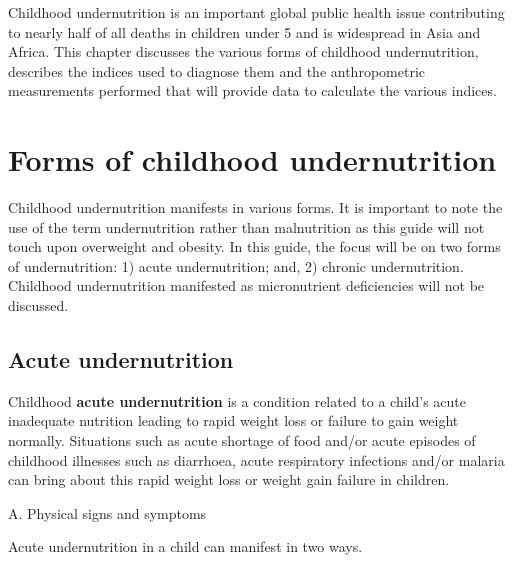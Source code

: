 \documentclass[12pt,]{book}
\theoremstyle{definition}
\theoremstyle{definition}
\theoremstyle{definition}
\theoremstyle{remark}
\begin{document}
Childhood undernutrition is an important global public health issue
contributing to nearly half of all deaths in children under 5 and is
widespread in Asia and Africa. This chapter discusses the various forms
of childhood undernutrition, describes the indices used to diagnose them
and the anthropometric measurements performed that will provide data to
calculate the various indices.

\hypertarget{forms-of-childhood-undernutrition}{%
\section{Forms of childhood
undernutrition}\label{forms-of-childhood-undernutrition}}

Childhood undernutrition manifests in various forms. It is important to
note the use of the term undernutrition rather than malnutrition as this
guide will not touch upon overweight and obesity. In this guide, the
focus will be on two forms of undernutrition: 1) acute undernutrition;
and, 2) chronic undernutrition. Childhood undernutrition manifested as
micronutrient deficiencies will not be discussed.

\hypertarget{acute-undernutrition}{%
\subsection{Acute undernutrition}\label{acute-undernutrition}}

Childhood \textbf{acute undernutrition} is a condition related to a
child's acute inadequate nutrition leading to rapid weight loss or
failure to gain weight normally. Situations such as acute shortage of
food and/or acute episodes of childhood illnesses such as diarrhoea,
acute respiratory infections and/or malaria can bring about this rapid
weight loss or weight gain failure in children.

\newpage

A. Physical signs and symptoms

Acute undernutrition in a child can manifest in two ways.
\end{document}
